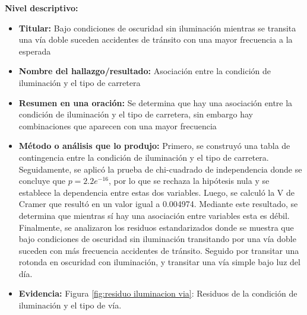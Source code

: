 \documentclass[12pt]{article}
\begin{document}
\textbf{Nivel descriptivo:}
\begin{itemize}
  \item \textbf{Titular:} Bajo condiciones de oscuridad sin iluminación mientras
  se transita una vía doble suceden accidentes de tránsito con una mayor frecuencia a la esperada 

  \item \textbf{Nombre del hallazgo/resultado:} Asociación entre la condición de 
  iluminación y el tipo de carretera 

  \item \textbf{Resumen en una oración:} Se determina que hay una asociación entre 
  la condición de iluminación y el tipo de carretera, sin embargo hay combinaciones 
  que aparecen con una mayor frecuencia 

  \item \textbf{Método o análisis que lo produjo:} Primero, se construyó una tabla 
  de contingencia entre la condición de iluminación y el tipo de carretera. 
  Seguidamente, se aplicó la prueba de chi-cuadrado de independencia donde 
  se concluye que $p=2.2e^{-16}$, por lo que se rechaza la hipótesis nula y 
  se establece la dependencia entre estas dos variables. Luego, se calculó 
  la V de Cramer que resultó en un valor igual a 0.004974. Mediante este resultado, 
  se determina que mientras sí hay una asociación entre variables esta es débil. 
  Finalmente, se analizaron los residuos estandarizados donde se muestra que bajo 
  condiciones de oscuridad sin iluminación transitando por una vía doble suceden 
  con más frecuencia accidentes de tránsito. Seguido por transitar una rotonda en 
  oscuridad con iluminación, y transitar una vía simple bajo luz del día.
  
  \item \textbf{Evidencia:} Figura \ref{fig:residuo iluminacion via}: Residuos de la condición 
  de iluminación y el tipo de vía. \\
\end{itemize}
\end{document}
